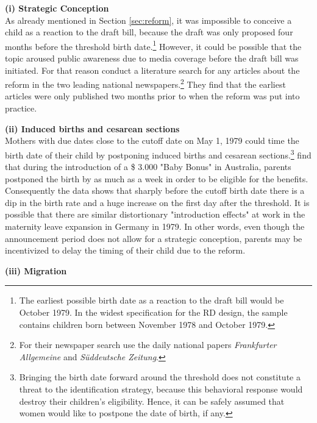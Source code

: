 \documentclass[11pt, a4paper,draft]{article} %
\begin{document}
\bigskip
\textbf{(i) Strategic Conception}\\ As already mentioned in Section \ref{sec:reform}, it was impossible to conceive a child as a reaction to the draft bill, because the draft was only proposed four months before the threshold birth date.\footnote{The earliest possible birth date as a reaction to the draft bill would be October 1979. In the widest specification for the RD design, the sample contains children born between November 1978 and October 1979.} However, it could be possible that the topic aroused public awareness due to media coverage before the draft bill was initiated. For that reason \cite{dustmann2012expansions} conduct a literature search for any articles about the reform in the two leading national newspapers.\footnote{For their newspaper search \cite{dustmann2012expansions} use the daily national papers \emph{Frankfurter Allgemeine} and \emph{Süddeutsche Zeitung}.} They find that the earliest articles were only published two months prior to when the reform was put into practice.

\bigskip
\textbf{(ii) Induced births and cesarean sections}\\ Mothers with due dates close to the cutoff date on May 1, 1979 could time the birth date of their child by postponing induced births and cesarean sections.\footnote{Bringing the birth date forward around the threshold does not constitute a threat to the identification strategy, because this behavioral response would destroy their children's eligibility. Hence, it can be safely assumed that women would like to postpone the date of birth, if any.} \cite{gans2009born} find that during the introduction of a \$ 3.000 "Baby Bonus" in Australia, parents postponed the birth by as much as a week in order to be eligible for the benefits. Consequently the data shows that sharply before the cutoff birth date there is a dip in the birth rate and a huge increase on the first day after the threshold.\newline
It is possible that there are similar distortionary "introduction effects" at work in the maternity leave expansion in Germany in 1979. In other words, even though the announcement period does not allow for a strategic conception, parents may be incentivized to delay the timing of their child due to the reform. 

\bigskip
\textbf{(iii) Migration}
\end{document}
